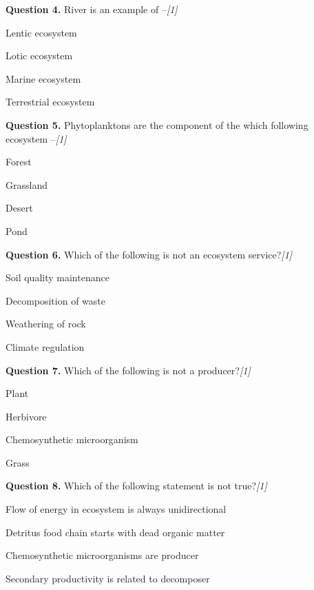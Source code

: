 \documentclass[11pt,a4paper]{article}
\newcommand{\pts}[1]{\hfill \textit{[#1]}}
\begin{document}
\medskip

\noindent \textbf{Question 4.} River is an example of --\pts{1}
\begin{parts}
  \item Lentic ecosystem
  \item Lotic ecosystem
  \item Marine ecosystem
  \item Terrestrial ecosystem
\end{parts}

\medskip

\noindent \textbf{Question 5.} Phytoplanktons are the component of the which following ecosystem --\pts{1}
\begin{parts}
  \item Forest
  \item Grassland
  \item Desert
  \item Pond
\end{parts}

\medskip

\noindent \textbf{Question 6.} Which of the following is not an ecosystem service?\pts{1}
\begin{parts}
  \item Soil quality maintenance
  \item Decomposition of waste
  \item Weathering of rock
  \item Climate regulation
\end{parts}

\medskip

\noindent \textbf{Question 7.} Which of the following is not a producer?\pts{1}
\begin{parts}
  \item Plant
  \item Herbivore
  \item Chemosynthetic microorganism
  \item Grass
\end{parts}

\medskip

\noindent \textbf{Question 8.} Which of the following statement is not true?\pts{1}
\begin{parts}
  \item Flow of energy in ecosystem is always unidirectional
  \item Detritus food chain starts with dead organic matter
  \item Chemosynthetic microorganisms are producer
  \item Secondary productivity is related to decomposer
\end{parts}
\end{document}
